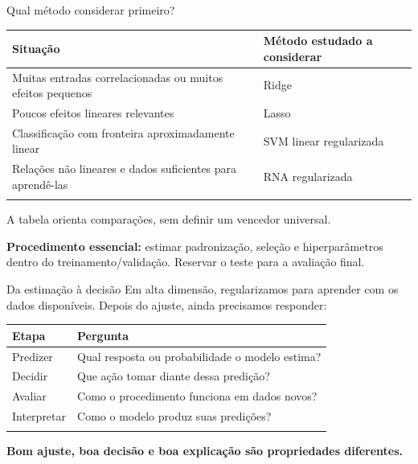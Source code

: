 \documentclass[
  10pt,
  ignorenonframetext,
  aspectratio=169,
  brazilian,
]{beamer}
\newcounter{none} %
\begin{document}
\begin{frame}{Qual método considerar primeiro?}
\protect{}\label{qual-muxe9todo-considerar-primeiro}
{\def\LTcaptype{none} %
\begin{longtable}[]{@{}
  >{\raggedright\arraybackslash}p{}
  >{\raggedright\arraybackslash}p{}@{}}
\toprule\noalign{}
\begin{minipage}[b]{\linewidth}\raggedright
Situação
\end{minipage} & \begin{minipage}[b]{\linewidth}\raggedright
Método estudado a considerar
\end{minipage} \\
\midrule\noalign{}
\endhead
Muitas entradas correlacionadas ou muitos efeitos pequenos & Ridge \\
Poucos efeitos lineares relevantes & Lasso \\
Classificação com fronteira aproximadamente linear & SVM linear
regularizada \\
Relações não lineares e dados suficientes para aprendê-las & RNA
regularizada \\
\bottomrule\noalign{}
\end{longtable}
}

A tabela orienta comparações, sem definir um vencedor universal.

\textbf{Procedimento essencial:} estimar padronização, seleção e
hiperparâmetros dentro do treinamento/validação. Reservar o teste para a
avaliação final.
\end{frame}

\begin{frame}{Da estimação à decisão}
\protect{}\label{da-estimauxe7uxe3o-uxe0-decisuxe3o}
Em alta dimensão, regularizamos para aprender com os dados disponíveis.
Depois do ajuste, ainda precisamos responder:

{\def\LTcaptype{none} %
\begin{longtable}[]{@{}ll@{}}
\toprule\noalign{}
Etapa & Pergunta \\
\midrule\noalign{}
\endhead
Predizer & Qual resposta ou probabilidade o modelo estima? \\
Decidir & Que ação tomar diante dessa predição? \\
Avaliar & Como o procedimento funciona em dados novos? \\
Interpretar & Como o modelo produz suas predições? \\
\bottomrule\noalign{}
\end{longtable}
}

\textbf{Bom ajuste, boa decisão e boa explicação são propriedades
diferentes.}
\end{frame}
\end{document}

